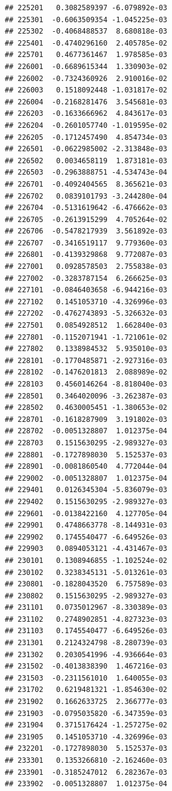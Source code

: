 \documentclass[ignorenonframetext,]{beamer}
\begin{document}
\begin{frame}[fragile]
\begin{verbatim}
## 225201   0.3082589397 -6.079892e-03
## 225301  -0.6063509354 -1.045225e-03
## 225302  -0.4068488537  8.680818e-03
## 225401  -0.4740296160  2.405785e-02
## 225701   0.4677361467  1.978585e-03
## 226001  -0.6689615344  1.330903e-02
## 226002  -0.7324360926  2.910016e-02
## 226003   0.1518092448 -1.031817e-02
## 226004  -0.2168281476  3.545681e-03
## 226203  -0.1633666962  4.843617e-03
## 226204  -0.2601057740 -1.019595e-02
## 226205  -0.1712457490  4.854734e-03
## 226501  -0.0622985002 -2.313848e-03
## 226502   0.0034658119  1.873181e-03
## 226503  -0.2963888751 -4.534743e-04
## 226701  -0.4092404565  8.365621e-03
## 226702   0.0839101793 -3.244280e-04
## 226704  -0.5131619642 -6.476662e-03
## 226705  -0.2613915299  4.705264e-02
## 226706  -0.5478217939  3.561892e-03
## 226707  -0.3416519117  9.779360e-03
## 226801  -0.4139329868  9.772087e-03
## 227001   0.0928578503  2.755838e-03
## 227002  -0.3283787154  6.266625e-03
## 227101  -0.0846403658 -6.944216e-03
## 227102   0.1451053710 -4.326996e-03
## 227202  -0.4762743893 -5.326632e-03
## 227501   0.0854928512  1.662840e-03
## 227801  -0.1152071941 -1.721061e-02
## 227802   0.1338984532  5.935010e-03
## 228101  -0.1770485871 -2.927316e-03
## 228102  -0.1476201813  2.088989e-02
## 228103   0.4560146264 -8.818040e-03
## 228501   0.3464020096 -3.262387e-03
## 228502   0.4630005451 -1.380653e-02
## 228701  -0.1618287909  3.191802e-03
## 228702  -0.0051328807  1.012375e-04
## 228703   0.1515630295 -2.989327e-03
## 228801  -0.1727898030  5.152537e-03
## 228901  -0.0081860540  4.772044e-04
## 229002  -0.0051328807  1.012375e-04
## 229401   0.0126345304 -5.836079e-03
## 229402   0.1515630295 -2.989327e-03
## 229601  -0.0138422160  4.127705e-04
## 229901   0.4748663778 -8.144931e-03
## 229902   0.1745540477 -6.649526e-03
## 229903   0.0894053121 -4.431467e-03
## 230101   0.1308946855 -1.102524e-02
## 230102   0.3238345131 -5.013261e-03
## 230801  -0.1828043520  6.757589e-03
## 230802   0.1515630295 -2.989327e-03
## 231101   0.0735012967 -8.330389e-03
## 231102   0.2748902851 -4.827323e-03
## 231103   0.1745540477 -6.649526e-03
## 231301   0.2124324798 -8.280739e-03
## 231302   0.2030541996 -4.936664e-03
## 231502  -0.4013838390  1.467216e-03
## 231503  -0.2311561010  1.640055e-03
## 231702   0.6219481321 -1.854630e-02
## 231902   0.1662633725  2.366777e-03
## 231903  -0.0795035820 -6.347359e-03
## 231904   0.3715176424 -1.257275e-02
## 231905   0.1451053710 -4.326996e-03
## 232201  -0.1727898030  5.152537e-03
## 233301   0.1353266810 -2.162460e-03
## 233901  -0.3185247012  6.282367e-03
## 233902  -0.0051328807  1.012375e-04

\end{verbatim}
\end{frame}
\end{document}
